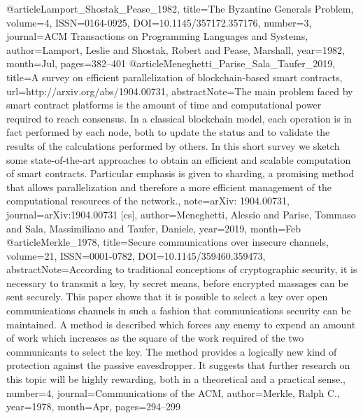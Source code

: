 {{ @article{Lamport_Shostak_Pease_1982, title={The Byzantine Generals Problem}, volume={4}, ISSN={0164-0925}, DOI={10.1145/357172.357176}, number={3}, journal={ACM Transactions on Programming Languages and Systems}, author={Lamport, Leslie and Shostak, Robert and Pease, Marshall}, year={1982}, month={Jul}, pages={382–401} }
 @article{Meneghetti_Parise_Sala_Taufer_2019, title={A survey on efficient parallelization of blockchain-based smart contracts}, url={http://arxiv.org/abs/1904.00731}, abstractNote={The main problem faced by smart contract platforms is the amount of time and computational power required to reach consensus. In a classical blockchain model, each operation is in fact performed by each node, both to update the status and to validate the results of the calculations performed by others. In this short survey we sketch some state-of-the-art approaches to obtain an eﬃcient and scalable computation of smart contracts. Particular emphasis is given to sharding, a promising method that allows parallelization and therefore a more eﬃcient management of the computational resources of the network.}, note={arXiv: 1904.00731}, journal={arXiv:1904.00731 [cs]}, author={Meneghetti, Alessio and Parise, Tommaso and Sala, Massimiliano and Taufer, Daniele}, year={2019}, month={Feb} }
 @article{Merkle_1978, title={Secure communications over insecure channels}, volume={21}, ISSN={0001-0782}, DOI={10.1145/359460.359473}, abstractNote={According to traditional conceptions of cryptographic security, it is necessary to transmit a key, by secret means, before encrypted massages can be sent securely. This paper shows that it is possible to select a key over open communications channels in such a fashion that communications security can be maintained. A method is described which forces any enemy to expend an amount of work which increases as the square of the work required of the two communicants to select the key. The method provides a logically new kind of protection against the passive eavesdropper. It suggests that further research on this topic will be highly rewarding, both in a theoretical and a practical sense.}, number={4}, journal={Communications of the ACM}, author={Merkle, Ralph C.}, year={1978}, month={Apr}, pages={294–299} }
}}
